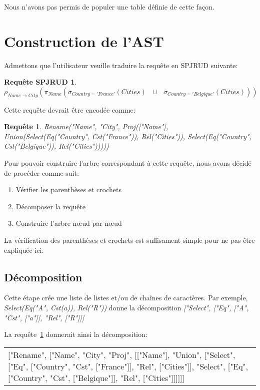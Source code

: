 \documentclass[]{article}
\newtheorem{SPJRUDRequest}{Requ\^ete SPJRUD}
\newtheorem{request}{Requ\^ete}
\begin{document}
Nous n'avons pas permis de populer une table d\'efinie de cette fa\c{c}on.

\section{Construction de l'AST}

Admettons que l'utilisateur veuille traduire la requ\^ete en SPJRUD suivante:

\begin{SPJRUDRequest}
$\rho_{Name \to City}(\pi_{Name}(\sigma_{Country='France'}(Cities) \text{ } \cup \text{ } \sigma_{Country='Belgique'}(Cities)))$
\end{SPJRUDRequest}

Cette requ\^ete devrait \^etre encod\'ee comme:

\begin{request}\label{request1}
Rename("Name", "City", Proj(["Name"], Union(Select(Eq("Country", Cst("France")), Rel("Cities")), Select(Eq("Country", Cst("Belgique")), Rel("Cities")))))
\end{request}

Pour pouvoir construire l'arbre correspondant \`a cette requ\^ete, nous avons d\'ecid\'e de proc\'eder comme suit:

\begin{enumerate}
	\item V\'erifier les parenth\`eses et crochets
	\item D\'ecomposer la requ\^ete
	\item Construire l'arbre n\oe{}ud par n\oe{}ud
\end{enumerate}

La v\'erification des parenth\`eses et crochets est suffisament simple pour ne pas \^etre expliqu\'ee ici.

\subsection{D\'ecomposition}
Cette \'etape cr\'ee une liste de listes et/ou de chaînes de caract\`eres. Par exemple, \textit{Select(Eq("A", Cst(a)), Rel("R"))} donne la d\'ecomposition \textit{["Select", ["Eq", ["A", "Cst", ["a"]], "Rel", ["R"]]]}

La requ\^ete~\ref{request1} donnerait ainsi la d\'ecomposition:

\begin{center}
	\begin{tabular}{p{250px}}
		["Rename", ["Name", "City", "Proj", [["Name"], "Union", ["Select", ["Eq", ["Country", "Cst", ["France"]], "Rel", ["Cities"]], "Select", ["Eq", ["Country", "Cst", ["Belgique"]], "Rel", ["Cities"]]]]]]
	\end{tabular}\label{decomposition}
\end{center}
\end{document}
